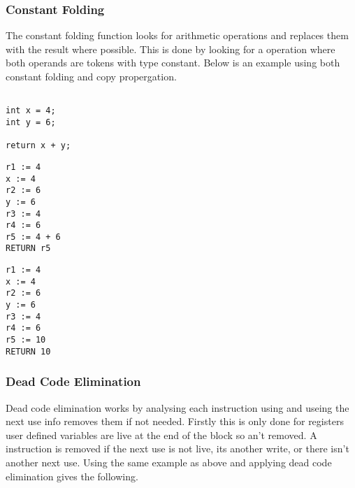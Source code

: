 \documentclass{article}
\begin{document}
\subsubsection{Constant Folding}

The constant folding function looks for arithmetic operations and replaces them
with the result where possible. This is done by looking for a operation where both
operands are tokens with type constant. Below is an example using both constant
folding and copy propergation.

\begin{minipage}{0.3\textwidth}
\begin{lstlisting}

int x = 4;
int y = 6;

return x + y;

\end{lstlisting}
\end{minipage}%
\begin{minipage}{0.3\textwidth}
\begin{lstlisting}
r1 := 4
x := 4
r2 := 6
y := 6
r3 := 4
r4 := 6
r5 := 4 + 6
RETURN r5

\end{lstlisting}
\end{minipage}%
\begin{minipage}{0.3\textwidth}
\begin{lstlisting}
r1 := 4
x := 4
r2 := 6
y := 6
r3 := 4
r4 := 6
r5 := 10
RETURN 10
\end{lstlisting}
\end{minipage}%

\subsubsection{Dead Code Elimination}

Dead code elimination works by analysing each instruction using and useing the
next use info removes them if not needed. Firstly this is only done for registers
user defined variables are live at the end of the block so an't removed. A instruction
is removed if the next use is not live, its another write, or there isn't another
next use. Using the same example as above and applying dead code elimination gives
the following.
\end{document}
